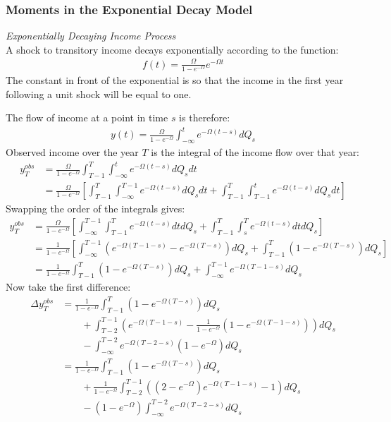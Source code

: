 \documentclass[12pt,pdftex,letterpaper]{article}
\begin{document}
\subsubsection{Moments in the Exponential Decay Model} \label{exp_decay_moments_appendix}

\textit{Exponentially Decaying Income Process}\\

A shock to transitory income decays exponentially according to the function:
\begin{align*}
f(t) = \frac{\Omega}{1-e^{-\Omega}} e^{-\Omega t}
\end{align*}
The constant in front of the exponential is so that the income in the first year following a unit shock will be equal to one.

The flow of income at a point in time $s$ is therefore:
\begin{align*}
y(t) = \frac{\Omega}{1-e^{-\Omega}} \int_{-\infty}^{t} e^{-\Omega (t-s)}dQ_s
\end{align*}
Observed income over the year $T$ is the integral of the income flow over that year:
\begin{align*}
y_T^{obs} &=\frac{\Omega}{1-e^{-\Omega}} \int_{T-1}^{T} \int_{-\infty}^{t} e^{-\Omega (t-s)}dQ_s dt \\
&= \frac{\Omega}{1-e^{-\Omega}} \left[ \int_{T-1}^{T} \int_{-\infty}^{T-1} e^{-\Omega (t-s)}dQ_s dt + \int_{T-1}^{T} \int_{T-1}^{t} e^{-\Omega (t-s)}dQ_s dt \right] 
\end{align*}
Swapping the order of the integrals gives:
\begin{align*}
y_T^{obs} &=\frac{\Omega}{1-e^{-\Omega}} \left[ \int_{-\infty}^{T-1} \int_{T-1}^{T} e^{-\Omega (t-s)} dt dQ_s  + \int_{T-1}^{T} \int_{s}^{T} e^{-\Omega (t-s)} dt dQ_s \right] \\
&=\frac{1}{1-e^{-\Omega}} \left[ \int_{-\infty}^{T-1} ( e^{-\Omega (T-1-s)} - e^{-\Omega (T-s)}) dQ_s  + \int_{T-1}^{T}  ( 1 - e^{-\Omega (T-s)} ) dQ_s \right] \\
&= \frac{1}{1-e^{-\Omega}}\int_{T-1}^{T}  ( 1 - e^{-\Omega (T-s)} ) dQ_s  + \int_{-\infty}^{T-1}  e^{-\Omega (T-1-s)} dQ_s  
\end{align*}
Now take the first difference:
\begin{align*}
\Delta y_T^{obs} &=\frac{1}{1-e^{-\Omega}}\int_{T-1}^{T}  ( 1 - e^{-\Omega (T-s)} ) dQ_s \\ & \qquad + \int_{T-2}^{T-1} \left( e^{-\Omega (T-1-s)}   - \frac{1}{1-e^{-\Omega}}  ( 1 - e^{-\Omega (T-1-s)} ) \right) dQ_s \\
& \qquad - \int_{-\infty}^{T-2}  e^{-\Omega (T-2-s)} (1-e^{-\Omega}) dQ_s  \\
&=\frac{1}{1-e^{-\Omega}}\int_{T-1}^{T}  ( 1 - e^{-\Omega (T-s)} ) dQ_s \\ & \qquad +  \frac{1}{1-e^{-\Omega}} \int_{T-2}^{T-1}\left( (2-e^{-\Omega}) e^{-\Omega (T-1-s)} -1  \right)dQ_s \\
& \qquad -  (1-e^{-\Omega}) \int_{-\infty}^{T-2}  e^{-\Omega (T-2-s)} dQ_s 
\end{align*}
\end{document}
